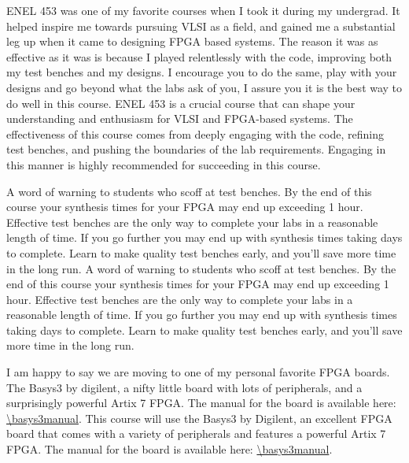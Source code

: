 
\normalsize
\ifdefined\devinisteaching
ENEL 453 was one of my favorite courses when I took it during my undergrad. It helped inspire me towards pursuing VLSI as a field, and gained me a substantial leg up when it came to designing FPGA based systems. The reason it was as effective as it was is because I played relentlessly with the code, improving both my test benches and my designs. I encourage you to do the same, play with your designs and go beyond what the labs ask of you, I assure you it is the best way to do well in this course. 
\else
 ENEL 453 is a crucial course that can shape your understanding and enthusiasm for VLSI and FPGA-based systems. The effectiveness of this course comes from deeply engaging with the code, refining test benches, and pushing the boundaries of the lab requirements. Engaging in this manner is highly recommended for succeeding in this course.
\fi
\bigskip

\ifdefined\devinisteaching
A word of warning to students who scoff at test benches. By the end of this course your synthesis times for your FPGA may end up exceeding 1 hour. Effective test benches are the only way to complete your labs in a reasonable length of time. If you go further you may end up with synthesis times taking days to complete. Learn to make quality test benches early, and you'll save more time in the long run. 
\else
A word of warning to students who scoff at test benches. By the end of this course your synthesis times for your FPGA may end up exceeding 1 hour. Effective test benches are the only way to complete your labs in a reasonable length of time. If you go further you may end up with synthesis times taking days to complete. Learn to make quality test benches early, and you'll save more time in the long run. 
\fi
\bigskip

\ifdefined\devinisteaching
I am happy to say we are moving to one of my personal favorite FPGA boards. The Basys3 by digilent, a nifty little board with lots 
of peripherals, and a surprisingly powerful Artix 7 FPGA. The manual for the board is available here: \url{\basys3manual}. 
\else
  This course will use the Basys3 by Digilent, an excellent FPGA board that comes with a variety of peripherals and features a powerful Artix 7 FPGA. The manual for the board is available here: \url{\basys3manual}.
\fi